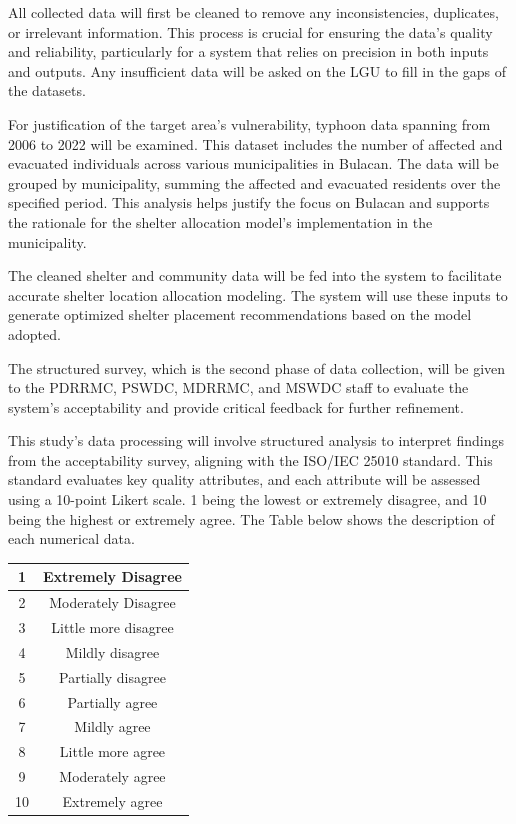	All collected data will first be cleaned to remove any inconsistencies, duplicates, or irrelevant information. This process is crucial for ensuring the data’s quality and reliability, particularly for a system that relies on precision in both inputs and outputs. Any insufficient data will be asked on the LGU to fill in the gaps of the datasets. 
	
	For justification of the target area’s vulnerability, typhoon data spanning from 2006 to 2022 will be examined. This dataset includes the number of affected and evacuated individuals across various municipalities in Bulacan. The data will be grouped by municipality, summing the affected and evacuated residents over the specified period. This analysis helps justify the focus on Bulacan and supports the rationale for the shelter allocation model’s implementation in the municipality.
	
	The cleaned shelter and community data will be fed into the system to facilitate accurate shelter location allocation modeling. The system will use these inputs to generate optimized shelter placement recommendations based on the model adopted.
	
	The structured survey, which is the second phase of data collection, will be given to the PDRRMC, PSWDC, MDRRMC, and MSWDC staff to evaluate the system's acceptability and provide critical feedback for further refinement.
	
	This study's data processing will involve structured analysis to interpret findings from the acceptability survey, aligning with the ISO/IEC 25010 standard. This standard evaluates key quality attributes, and each attribute will be assessed using a 10-point Likert scale. 1 being the lowest or extremely disagree, and 10 being the highest or extremely agree. The Table below shows the description of each numerical data.
	
	\begin{table}[h]
		\centering
		\begin{tabular}{|c|c|}
			\hline
			1  & Extremely Disagree   \\ \hline
			2  & Moderately Disagree  \\ \hline
			3  & Little more disagree \\ \hline
			4  & Mildly disagree      \\ \hline
			5  & Partially disagree   \\ \hline
			6  & Partially agree      \\ \hline
			7  & Mildly agree         \\ \hline
			8  & Little more agree    \\ \hline
			9  & Moderately agree     \\ \hline
			10 & Extremely agree      \\ \hline
		\end{tabular}
	\end{table}
	
